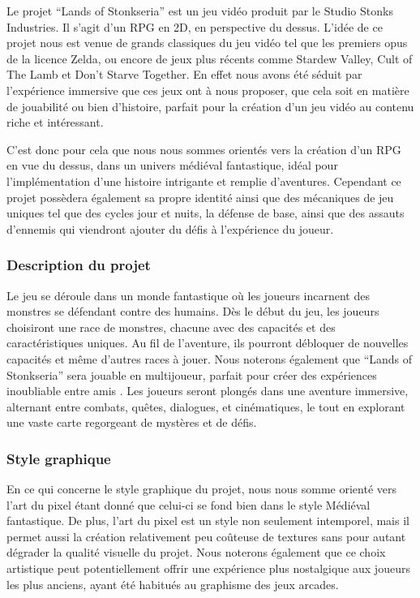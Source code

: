 \vspace*{0.2cm}

Le projet “Lands of Stonkseria” est un jeu vidéo produit par le Studio Stonks Industries.
Il s’agit d’un RPG en 2D, en perspective du dessus.
L’idée de ce projet nous est venue de grands classiques du jeu vidéo tel que les premiers opus de la licence Zelda, ou encore de jeux plus récents comme Stardew Valley, Cult of The Lamb et Don’t Starve Together.
En effet nous avons été séduit par l'expérience immersive que ces jeux ont à nous proposer, que cela soit en matière de jouabilité ou bien d’histoire, parfait pour la création d’un jeu vidéo au contenu riche et intéressant.

C’est donc pour cela que nous nous sommes orientés vers la création d’un RPG en vue du dessus, dans un univers médiéval fantastique, idéal pour l’implémentation d’une histoire intrigante et remplie d’aventures.
Cependant ce projet possèdera également sa propre identité ainsi que des mécaniques de jeu uniques tel que des cycles jour et nuits, la défense de base, ainsi que des assauts d’ennemis qui viendront ajouter du défis à l'expérience du joueur.

\subsubsection*{\hspace*{0.6cm}Description du projet}

Le jeu se déroule dans un monde fantastique où les joueurs incarnent des monstres se défendant contre des humains.
Dès le début du jeu, les joueurs choisiront une race de monstres, chacune avec des capacités et des caractéristiques uniques.
Au fil de l'aventure, ils pourront débloquer de nouvelles capacités et même d'autres races à jouer.
Nous noterons également que “Lands of Stonkseria” sera jouable en multijoueur, parfait pour créer des expériences  inoubliable entre amis .
Les joueurs seront plongés dans une aventure immersive, alternant entre combats, quêtes, dialogues, et cinématiques, le tout en explorant une vaste carte regorgeant de mystères et de défis.

\subsubsection*{\hspace*{0.6cm}Style graphique}

En ce qui concerne le style graphique du projet, nous nous somme orienté vers l’art du pixel étant donné que celui-ci se fond bien dans le style Médiéval fantastique.
De plus, l’art du pixel est un style non seulement intemporel, mais il permet aussi la création relativement peu coûteuse de textures sans pour autant dégrader la qualité visuelle du projet.
Nous noterons également que ce choix artistique peut potentiellement offrir une expérience plus nostalgique aux joueurs les plus anciens, ayant été habitués au graphisme des jeux arcades.
